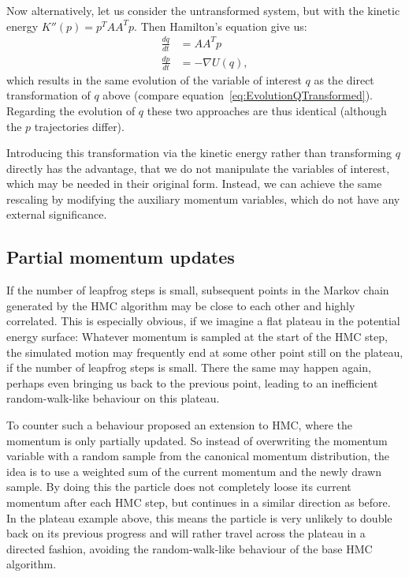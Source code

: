 Now alternatively, let us consider the untransformed system, but with the kinetic energy $K''(p) = p^T A A^T p$. Then Hamilton's equation give us:
\begin{equation}
\begin{split}
\frac{dq}{dt} &= A A^T p \\
\frac{dp}{dt} &= - \nabla U(q),
\end{split}
\end{equation}
which results in the same evolution of the variable of interest $q$ as the direct transformation of $q$ above (compare equation~\eqref{eq:EvolutionQTransformed}). Regarding the evolution of $q$ these two approaches are thus identical (although the $p$ trajectories differ).

Introducing this transformation via the kinetic energy rather than transforming $q$ directly has the advantage, that we do not manipulate the variables of interest, which may be needed in their original form. Instead, we can achieve the same rescaling by modifying the auxiliary momentum variables, which do not have any external significance.

\subsection{Partial momentum updates}
\label{sec:PartialMomentumUpdate}
If the number of leapfrog steps is small, subsequent points in the Markov chain generated by the HMC algorithm may be close to each other and highly correlated. This is especially obvious, if we imagine a flat plateau in the potential energy surface: Whatever momentum is sampled at the start of the HMC step, the simulated motion may frequently end at some other point still on the plateau, if the number of leapfrog steps is small. There the same may happen again, perhaps even bringing us back to the previous point, leading to an inefficient random-walk-like behaviour on this plateau.

To counter such a behaviour \textcite{Horowitz1991} proposed an extension to HMC, where the momentum is only partially updated. So instead of overwriting the momentum variable with a random sample from the canonical momentum distribution, the idea is to use a weighted sum of the current momentum and the newly drawn sample. By doing this the particle does not completely loose its current momentum after each HMC step, but continues in a similar direction as before. In the plateau example above, this means the particle is very unlikely to double back on its previous progress and will rather travel across the plateau in a directed fashion, avoiding the random-walk-like behaviour of the base HMC algorithm.

